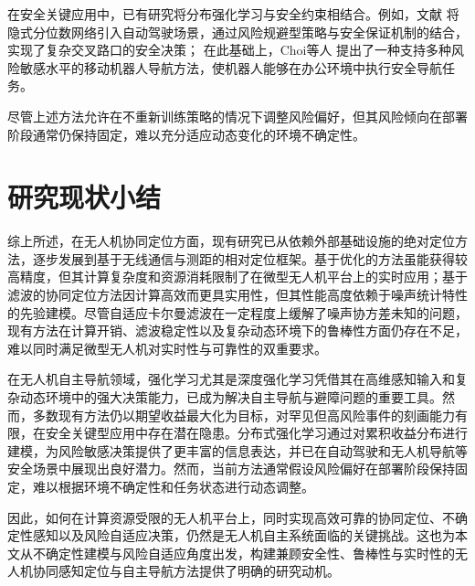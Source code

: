 在安全关键应用中，已有研究将分布强化学习与安全约束相结合。例如，文献 将隐式分位数网络引入自动驾驶场景，通过风险规避型策略与安全保证机制的结合，实现了复杂交叉路口的安全决策；
在此基础上，Choi等人\cite{choi2021risk} 提出了一种支持多种风险敏感水平的移动机器人导航方法，使机器人能够在办公环境中执行安全导航任务。

尽管上述方法允许在不重新训练策略的情况下调整风险偏好，但其风险倾向在部署阶段通常仍保持固定，难以充分适应动态变化的环境不确定性。

\section{研究现状小结}


综上所述，在无人机协同定位方面，现有研究已从依赖外部基础设施的绝对定位方法，逐步发展到基于无线通信与测距的相对定位框架。基于优化的方法虽能获得较高精度，但其计算复杂度和资源消耗限制了在微型无人机平台上的实时应用；基于滤波的协同定位方法因计算高效而更具实用性，但其性能高度依赖于噪声统计特性的先验建模。尽管自适应卡尔曼滤波在一定程度上缓解了噪声协方差未知的问题，现有方法在计算开销、滤波稳定性以及复杂动态环境下的鲁棒性方面仍存在不足，难以同时满足微型无人机对实时性与可靠性的双重要求。

在无人机自主导航领域，强化学习尤其是深度强化学习凭借其在高维感知输入和复杂动态环境中的强大决策能力，已成为解决自主导航与避障问题的重要工具。然而，多数现有方法仍以期望收益最大化为目标，对罕见但高风险事件的刻画能力有限，在安全关键型应用中存在潜在隐患。分布式强化学习通过对累积收益分布进行建模，为风险敏感决策提供了更丰富的信息表达，并已在自动驾驶和无人机导航等安全场景中展现出良好潜力。然而，当前方法通常假设风险偏好在部署阶段保持固定，难以根据环境不确定性和任务状态进行动态调整。

因此，如何在计算资源受限的无人机平台上，同时实现高效可靠的协同定位、不确定性感知以及风险自适应决策，仍然是无人机自主系统面临的关键挑战。这也为本文从不确定性建模与风险自适应角度出发，构建兼顾安全性、鲁棒性与实时性的无人机协同感知定位与自主导航方法提供了明确的研究动机。